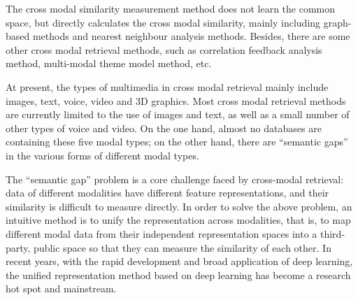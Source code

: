 The cross modal similarity measurement method does not learn the common space, but directly calculates the cross modal similarity, mainly including graph-based methods and nearest neighbour analysis methods. Besides, there are some other cross modal retrieval methods, such as correlation feedback analysis method, multi-modal theme model method, etc.

At present, the types of multimedia in cross modal retrieval mainly include images, text, voice, video and 3D graphics. Most cross modal retrieval methods are currently limited to the use of images and text, as well as a small number of other types of voice and video. On the one hand, almost no databases are containing these five modal types; on the other hand, there are ``semantic gaps'' in the various forms of different modal types.

The ``semantic gap'' problem is a core challenge faced by cross-modal retrieval: data of different modalities have different feature representations, and their similarity is difficult to measure directly. In order to solve the above problem, an intuitive method is to unify the representation across modalities, that is, to map different modal data from their independent representation spaces into a third-party, public space so that they can measure the similarity of each other. In recent years, with the rapid development and broad application of deep learning, the unified representation method based on deep learning has become a research hot spot and mainstream.




